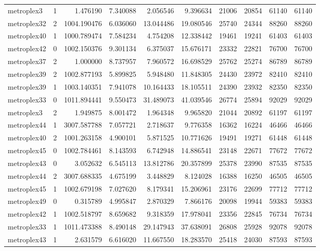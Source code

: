 \begin{longtable}{|l|r|r|r|r|r|r|r|r|r|}
metroplex3 & 1 & 1.476190 & 7.340088 & 2.056546 & 9.396634 & 21006 & 20854 & 61140 & 61140 \\
metroplex32 & 2 & 1004.190476 & 6.036060 & 13.044486 & 19.080546 & 25740 & 24344 & 88260 & 88260 \\
metroplex40 & 1 & 1000.789474 & 7.584234 & 4.754208 & 12.338442 & 19461 & 19241 & 61403 & 61403 \\
metroplex42 & 0 & 1002.150376 & 9.301134 & 6.375037 & 15.676171 & 23332 & 22821 & 76700 & 76700 \\
metroplex37 & 2 & 1.000000 & 8.737957 & 7.960572 & 16.698529 & 25762 & 25274 & 86789 & 86789 \\
metroplex39 & 2 & 1002.877193 & 5.899825 & 5.948480 & 11.848305 & 24430 & 23972 & 82410 & 82410 \\
metroplex39 & 1 & 1003.140351 & 7.941078 & 10.164433 & 18.105511 & 24390 & 23932 & 82350 & 82350 \\
metroplex33 & 0 & 1011.894441 & 9.550473 & 31.489073 & 41.039546 & 26774 & 25894 & 92029 & 92029 \\
metroplex3 & 2 & 1.949875 & 8.001472 & 1.964348 & 9.965820 & 21044 & 20892 & 61197 & 61197 \\
metroplex44 & 1 & 3007.587788 & 7.057721 & 2.718637 & 9.776358 & 16362 & 16224 & 46466 & 46466 \\
metroplex40 & 2 & 1001.263158 & 4.900101 & 5.871525 & 10.771626 & 19491 & 19271 & 61448 & 61448 \\
metroplex45 & 0 & 1002.784461 & 8.143593 & 6.742948 & 14.886541 & 23148 & 22671 & 77672 & 77672 \\
metroplex43 & 0 & 3.052632 & 6.545113 & 13.812786 & 20.357899 & 25378 & 23990 & 87535 & 87535 \\
metroplex44 & 2 & 3007.688335 & 4.675199 & 3.448829 & 8.124028 & 16388 & 16250 & 46505 & 46505 \\
metroplex45 & 1 & 1002.679198 & 7.027620 & 8.179341 & 15.206961 & 23176 & 22699 & 77712 & 77712 \\
metroplex49 & 0 & 0.315789 & 4.995847 & 2.870329 & 7.866176 & 20098 & 19944 & 59383 & 59383 \\
metroplex42 & 1 & 1002.518797 & 8.659682 & 9.318359 & 17.978041 & 23356 & 22845 & 76734 & 76734 \\
metroplex33 & 1 & 1011.473388 & 8.490148 & 29.147943 & 37.638091 & 26808 & 25928 & 92078 & 92078 \\
metroplex43 & 1 & 2.631579 & 6.616020 & 11.667550 & 18.283570 & 25418 & 24030 & 87593 & 87593 \\

\end{longtable}
